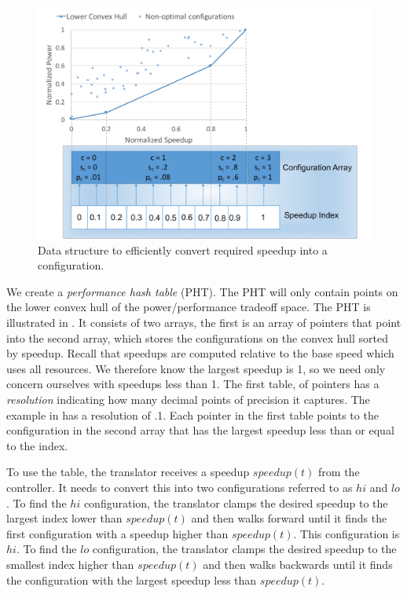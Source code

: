 \begin{figure}
\includegraphics[width=\columnwidth]{figures/perforamance-hash-table.pdf}
\caption{Data structure to efficiently convert required speedup into a
  configuration.}
  \label{fig:pht}
\end{figure}



We create a \emph{performance hash table} (PHT).  The PHT will only
contain points on the lower convex hull of the power/performance
tradeoff space.  The PHT is illustrated in .  It consists
of two arrays, the first is an array of pointers that point into the
second array, which stores the configurations on the convex hull
sorted by speedup.  Recall that speedups are computed relative to the
base speed which uses all resources.  We therefore know the largest
speedup is 1, so we need only concern ourselves with speedups less
than 1.  The first table, of pointers has a \emph{resolution}
indicating how many decimal points of precision it captures.  The
example in  has a resolution of .1.  Each pointer in the
first table points to the configuration in the second array that has
the largest speedup less than or equal to the index.

To use the table, the translator receives a speedup $speedup(t)$ from the
controller.  It needs to convert this into two configurations referred
to as $hi$ and $lo$.  To find the $hi$ configuration, the translator
clamps the desired speedup to the largest index lower than $speedup(t)$ and
then walks forward until it finds the first configuration with a
speedup higher than $speedup(t)$.  This configuration is $hi$.  To find the
$lo$ configuration, the translator clamps the desired speedup to the
smallest index higher than $speedup(t)$ and then walks backwards until it
finds the configuration with the largest speedup less than $speedup(t)$.

